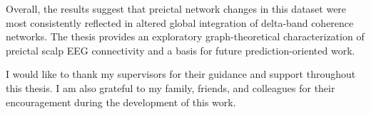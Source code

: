 \documentclass[a4paper,singleside,12pt]{report}
\begin{document}
    Overall, the results suggest that preictal network changes in this dataset were
    most consistently reflected in altered global integration of delta-band
    coherence networks. The thesis provides an exploratory graph-theoretical
    characterization of preictal scalp EEG connectivity and a basis for future
    prediction-oriented work.

    \cleardoublepage


    \toc
    \figstoc
    \tablestoc

    \begintext


    

    

    

    

    

    

    



    \appendix

    


    \printbibliography[heading=bibintoc]


    \acknowledgements

    I would like to thank my supervisors for their guidance and support
    throughout this thesis. I am also grateful to my family, friends, and
    colleagues for their encouragement during the development of this work.
\end{document}
